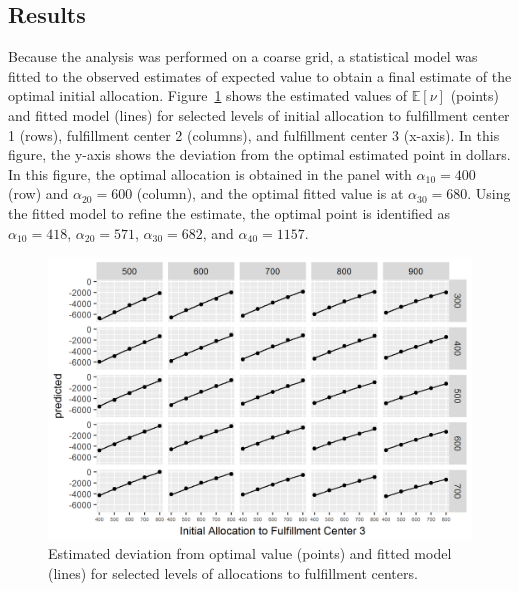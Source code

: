 \documentclass[11pt, oneside]{article}   	%
\begin{document}
\subsection{Results}

Because the analysis was performed on a coarse grid, a statistical model was fitted to the observed estimates of expected value to obtain a final estimate of the optimal initial allocation.  Figure~\ref{fi:modelbroad} shows the estimated values of $\mathbb{E}[\nu]$ (points) and fitted model (lines) for selected levels of initial allocation to fulfillment center 1 (rows), fulfillment center 2 (columns), and fulfillment center 3 (x-axis).  In this figure, the y-axis shows the deviation from the optimal estimated point in dollars.  In this figure, the optimal allocation is obtained in the panel with $\alpha_{10} = 400$ (row) and $\alpha_{20} = 600$ (column), and the optimal fitted value is at $\alpha_{30} = 680$.  Using the fitted model to refine the estimate, the optimal point is identified as $\alpha_{10} = 418$, $\alpha_{20} = 571$, $\alpha_{30} = 682$, and $\alpha_{40} = 1157$.

\begin{figure}
\centering
\includegraphics{model-fit-broad}
\caption{Estimated deviation from optimal value (points) and fitted model (lines) for selected levels of allocations to fulfillment centers.}  \label{fi:modelbroad}
\end{figure}
\end{document}
